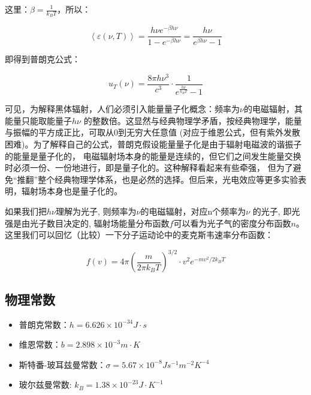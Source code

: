 \begin{enumerate}
这里：$\beta  = \frac{1}{{k_B T}}$，所以：

\begin{equation}
\left\langle {\varepsilon (\nu ,T)} \right\rangle  = \frac{{h\nu e^{ - \beta h\nu } }}{{1 - e^{ - \beta h\nu } }} = \frac{{h\nu }}{{e^{\beta h\nu }  - 1}}
\end{equation}

即得到普朗克公式：

\begin{equation}
u_T (\nu ) = \frac{{8\pi h\nu ^3 }}{{c^3 }} \cdot \frac{1}{{e^{\frac{{h\nu }}{{k_B T}}}  - 1}}\end{equation}

可见，为解释黑体辐射，人们必须引入能量量子化概念：频率为$\nu$的电磁辐射，其能量只能取能量子$h\nu $
的整数倍。这显然与经典物理学矛盾，按经典物理学，能量与振幅的平方成正比，可取从0到无穷大任意值
(对应于维恩公式，但有紫外发散困难)。为了解释自己的公式，普朗克假设能量量子化是由于辐射电磁波的谐振子的能量是量子化的，
电磁辐射场本身的能量是连续的，但它们之间发生能量交换时必须一份、一份地进行，即是量子化的。这种解释看起来有些牵强，
但为了避免“推翻”整个经典物理学体系，也是必然的选择。但后来，光电效应等更多实验表明，辐射场本身也是量子化的。


如果我们把$h\nu $理解为光子,
则频率为$\nu$的电磁辐射，对应n个频率为$\nu$ 的光子,
即光强是由光子数目决定的,
辐射场能量分布函数$f$可以看为光子气的密度分布函数$n$。这里我们可以回忆（比较）一下分子运动论中的麦克斯韦速率分布函数：

\begin{equation}
f(v)
= 4\pi \left( {\frac{m}{{2\pi k_B T}}} \right)^{3/2}  \cdot v^2 e^{
- mv^2 /2k_B T} 
\end{equation}

\end{enumerate}

\subsection*{物理常数}

\begin{itemize}
  \item 普朗克常数：$h = 6.626 \times 10^{ - 34} J \cdot s$
  \item 维恩常数：$b = 2.898 \times 10^{-3} m \cdot K$
  \item 斯特番-玻耳兹曼常数：$\sigma  = 5.67 \times 10^{ - 8} Js^{ - 1} m^{ - 2} K^{ - 4}$
  \item 玻尔兹曼常数: $k_B =1.38 \times 10^{-23} J \cdot K^{-1}$
\end{itemize}



